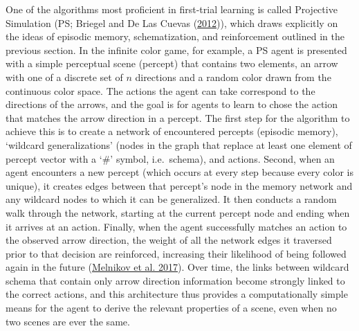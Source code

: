 \documentclass[twoside,12pt,final]{ucthesis-CA2012}
\begin{document}
\begin{ucmainmatter}
One of the algorithms most proficient in first-trial learning is called Projective Simulation (PS; Briegel and De Las Cuevas (\protect\hyperlink{ref-briegel2012}{2012})), which draws explicitly on the ideas of episodic memory, schematization, and reinforcement outlined in the previous section. In the infinite color game, for example, a PS agent is presented with a simple perceptual scene (percept) that contains two elements, an arrow with one of a discrete set of \(n\) directions and a random color drawn from the continuous color space. The actions the agent can take correspond to the directions of the arrows, and the goal is for agents to learn to chose the action that matches the arrow direction in a percept. The first step for the algorithm to achieve this is to create a network of encountered percepts (episodic memory), `wildcard generalizations' (nodes in the graph that replace at least one element of percept vector with a `\#' symbol, i.e.~schema), and actions. Second, when an agent encounters a new percept (which occurs at every step because every color is unique), it creates edges between that percept's node in the memory network and any wildcard nodes to which it can be generalized. It then conducts a random walk through the network, starting at the current percept node and ending when it arrives at an action. Finally, when the agent successfully matches an action to the observed arrow direction, the weight of all the network edges it traversed prior to that decision are reinforced, increasing their likelihood of being followed again in the future (\protect\hyperlink{ref-melnikov2017}{Melnikov et al. 2017}). Over time, the links between wildcard schema that contain only arrow direction information become strongly linked to the correct actions, and this architecture thus provides a computationally simple means for the agent to derive the relevant properties of a scene, even when no two scenes are ever the same.


\end{ucmainmatter}
\end{document}
